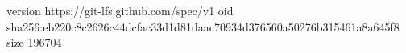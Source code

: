 version https://git-lfs.github.com/spec/v1
oid sha256:eb220c8c2626c44dcfac33d1d81daac70934d376560a50276b315461a8a645f8
size 196704
